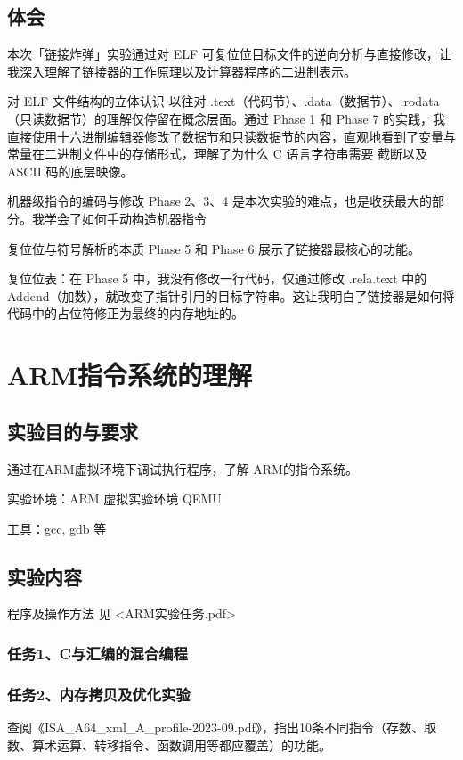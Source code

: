 \documentclass[supercite]{Experimental_Report}
\theoremstyle{definition}
\begin{document}
	
	\subsection{体会}
	本次「链接炸弹」实验通过对 ELF 可复位位目标文件的逆向分析与直接修改，让我深入理解了链接器的工作原理以及计算器程序的二进制表示。
	
	对 ELF 文件结构的立体认识 以往对 .text（代码节）、.data（数据节）、.rodata（只读数据节）的理解仅停留在概念层面。通过 Phase 1 和 Phase 7 的实践，我直接使用十六进制编辑器修改了数据节和只读数据节的内容，直观地看到了变量与常量在二进制文件中的存储形式，理解了为什么 C 语言字符串需要 \0 截断以及 ASCII 码的底层映像。
	
	机器级指令的编码与修改 Phase 2、3、4 是本次实验的难点，也是收获最大的部分。我学会了如何手动构造机器指令
	
	复位位与符号解析的本质 Phase 5 和 Phase 6 展示了链接器最核心的功能。
	
	复位位表：在 Phase 5 中，我没有修改一行代码，仅通过修改 .rela.text 中的 Addend（加数），就改变了指针引用的目标字符串。这让我明白了链接器是如何将代码中的占位符修正为最终的内存地址的。
	
	\section{ARM指令系统的理解}
	\subsection{实验目的与要求}
	通过在ARM虚拟环境下调试执行程序，了解 ARM的指令系统。
	
	实验环境：ARM 虚拟实验环境  QEMU
	
	工具：gcc, gdb 等
	
	
	\subsection{实验内容}
	程序及操作方法 见 <ARM实验任务.pdf>
	\subsubsection{任务1、C与汇编的混合编程}
	\subsubsection{任务2、内存拷贝及优化实验}
	查阅《ISA\_A64\_xml\_A\_profile-2023-09.pdf》，指出10条不同指令（存数、取数、算术运算、转移指令、函数调用等都应覆盖）的功能。
	
\end{document}
